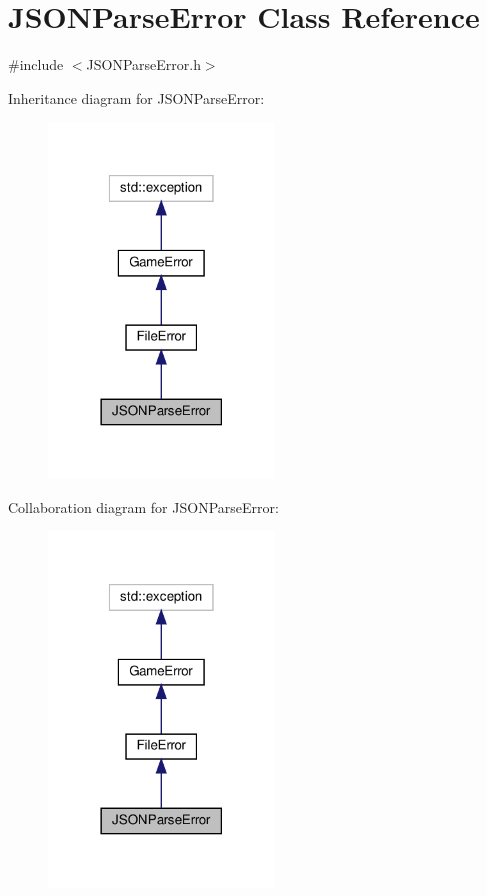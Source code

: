 \hypertarget{classJSONParseError}{}\section{J\+S\+O\+N\+Parse\+Error Class Reference}
\label{classJSONParseError}


{\ttfamily \#include $<$J\+S\+O\+N\+Parse\+Error.\+h$>$}



Inheritance diagram for J\+S\+O\+N\+Parse\+Error\+:\nopagebreak
\begin{figure}[H]
\begin{center}
\leavevmode
\includegraphics[width=170pt]{classJSONParseError__inherit__graph}
\end{center}
\end{figure}


Collaboration diagram for J\+S\+O\+N\+Parse\+Error\+:\nopagebreak
\begin{figure}[H]
\begin{center}
\leavevmode
\includegraphics[width=170pt]{classJSONParseError__coll__graph}
\end{center}
\end{figure}
